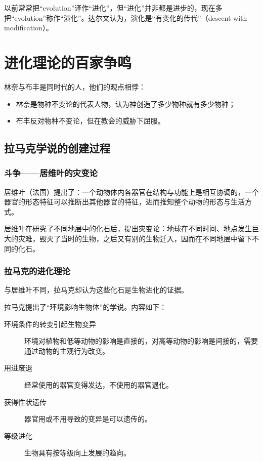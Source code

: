 
以前常常把“evolution”译作“进化”，但“进化”并非都是进步的，现在多把“evolution”称作“演化”。达尔文认为，演化是“有变化的传代”（descent with modification）。

\section{进化理论的百家争鸣}

林奈与布丰是同时代的人，他们的观点相悖：

\begin{itemize}
	\item 林奈是物种不变论的代表人物，认为神创造了多少物种就有多少物种；
	\item 布丰反对物种不变论，但在教会的威胁下屈服。
\end{itemize}

\subsection{拉马克学说的创建过程}

\subsubsection{斗争——居维叶的灾变论}

居维叶（法国）提出了：一个动物体内各器官在结构与功能上是相互协调的，一个器官的形态特征可以推断出其他器官的特征，进而推知整个动物的形态与生活方式。

居维叶在研究了不同地层中的化石后，提出灾变论：地球在不同时间、地点发生巨大的灾难，毁灭了当时的生物，之后又有别的生物迁入，因而在不同地层中留下不同的化石。

\subsubsection{拉马克的进化理论}

与居维叶不同，拉马克却认为这些化石是生物进化的证据。

拉马克提出了“环境影响生物体”的学说。内容如下：

\begin{description}
	\item[环境条件的转变引起生物变异] 环境对植物和低等动物的影响是直接的，对高等动物的影响是间接的，需要通过动物的主观行为改变。
	\item[用进废退] 经常使用的器官变得发达，不使用的器官退化。
	\item[获得性状遗传] 器官用或不用导致的变异是可以遗传的。
	\item[等级进化] 生物具有按等级向上发展的趋向。
\end{description}

